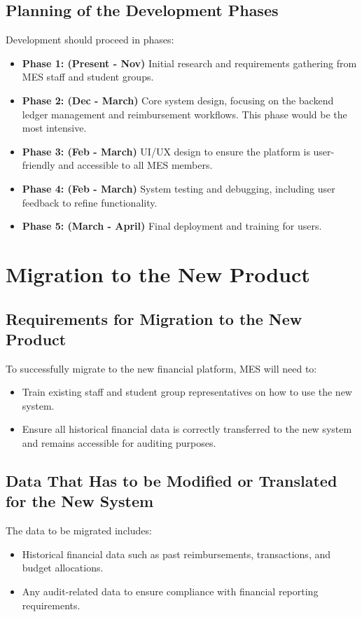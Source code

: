 \documentclass[12pt]{article}
\begin{document}
\subsection{Planning of the Development Phases}
Development should proceed in phases:
\begin{itemize}
    \item \textbf{Phase 1: (Present - Nov)} Initial research and requirements gathering from MES staff and student groups. 
    \item \textbf{Phase 2: (Dec - March)} Core system design, focusing on the backend ledger management and reimbursement workflows. This phase would be the most intensive.
    \item \textbf{Phase 3: (Feb - March) } UI/UX design to ensure the platform is user-friendly and accessible to all MES members.
    \item \textbf{Phase 4: (Feb - March)} System testing and debugging, including user feedback to refine functionality.
    \item \textbf{Phase 5: (March - April)} Final deployment and training for users.
\end{itemize}

\section{Migration to the New Product}
\subsection{Requirements for Migration to the New Product}
To successfully migrate to the new financial platform, MES will need to:
\begin{itemize}
    \item Train existing staff and student group representatives on how to use the new system.
    \item Ensure all historical financial data is correctly transferred to the new system and remains accessible for auditing purposes.
\end{itemize}

\subsection{Data That Has to be Modified or Translated for the New System}
The data to be migrated includes:
\begin{itemize}
    \item Historical financial data such as past reimbursements, transactions, and budget allocations.
    \item Any audit-related data to ensure compliance with financial reporting requirements.
\end{itemize}
\end{document}
